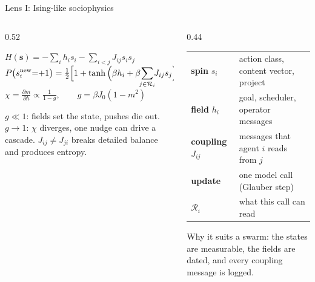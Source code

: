 \begin{frame}{Lens I: Ising-like sociophysics}
\begin{columns}[T,onlytextwidth]
\begin{column}{0.52\textwidth}
\colorbox{panel}{\parbox{\dimexpr\linewidth-2\fboxsep}{\small
\vspace{0.2em}
$\displaystyle H(\mathbf s)=-\sum_i h_i s_i-\sum_{i<j}J_{ij}s_is_j$\\[0.6em]
$\displaystyle P\big(s_i^{\rm new}{=}{+}1\big)=\tfrac12\Big[1+\tanh\Big(\beta h_i+\beta\!\!\sum_{j\in\mathcal R_i}\!\!J_{ij}s_j\Big)\Big]$\\[0.6em]
$\displaystyle \chi=\frac{\partial m}{\partial h}\propto\frac{1}{1-g},\qquad g=\beta J_0(1-m^2)$
\vspace{0.2em}}}\par\vspace{0.6em}
\footnotesize $g\ll1$: fields set the state, pushes die out. $g\to1$: $\chi$ diverges, one nudge can drive a cascade. $J_{ij}\neq J_{ji}$ breaks detailed balance and produces entropy.
\end{column}
\begin{column}{0.44\textwidth}
\footnotesize
\renewcommand{\arraystretch}{1.5}
\begin{tabular}{@{}>{\raggedright\arraybackslash}p{1.75cm} >{\raggedright\arraybackslash}p{3.7cm}@{}}
\textcolor{muted}{\textbf{spin} $s_i$} & action class, content vector, project\\
\textcolor{muted}{\textbf{field} $h_i$} & goal, scheduler, operator messages\\
\textcolor{muted}{\textbf{coupling} $J_{ij}$} & messages that agent $i$ reads from $j$\\
\textcolor{muted}{\textbf{update}} & one model call (Glauber step)\\
\textcolor{muted}{$\mathcal R_i$} & what this call can read\\
\end{tabular}\par\vspace{0.6em}
Why it suits a swarm: the states are measurable, the fields are dated, and every coupling message is logged.
\end{column}
\end{columns}
\end{frame}
